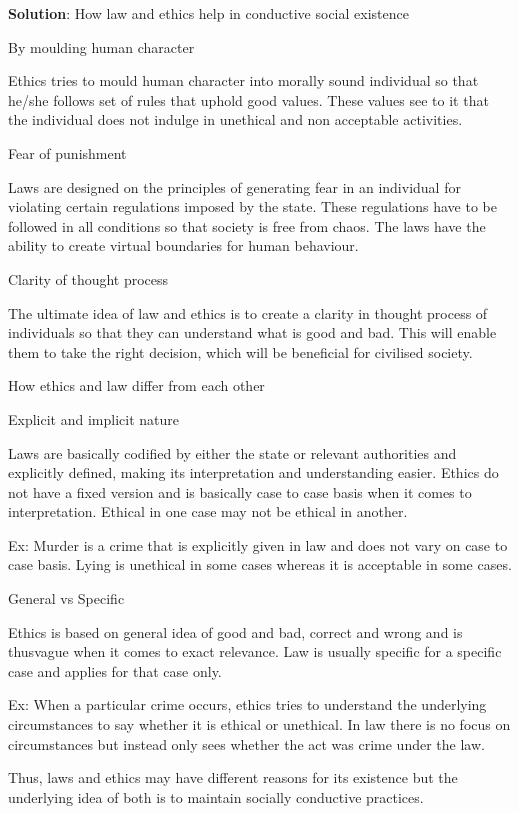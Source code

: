 \documentclass[
  openany]{book}
\newenvironment{solution}{ {\bfseries Solution}:}{}
\begin{document}
\begin{questions}
\begin{solution}
How law and ethics help in conductive social existence

By moulding human character

Ethics tries to mould human character into morally sound individual so that he/she follows set of rules that uphold good values. These values see to it that the individual does not indulge in unethical and non acceptable activities.

Fear of punishment

Laws are designed on the principles of generating fear in an individual for violating certain regulations imposed by the state. These regulations have to be followed in all conditions so that society is free from chaos. The laws have the ability to create virtual boundaries for human behaviour.

Clarity of thought process

The ultimate idea of law and ethics is to create a clarity in thought process of individuals so that they can understand what is good and bad. This will enable them to take the right decision, which will be beneficial for civilised society.

How ethics and law differ from each other

Explicit and implicit nature

Laws are basically codified by either the state or relevant authorities and explicitly defined, making its interpretation and understanding easier. Ethics do not have a fixed version and is basically case to case basis when it comes to interpretation. Ethical in one case may not be ethical in another.

Ex: Murder is a crime that is explicitly given in law and does not vary on case to case basis.
    Lying is unethical in some cases whereas it is acceptable in some cases.
    
General vs Specific

Ethics is based on general idea of good and bad, correct and wrong and is thusvague when it comes to exact relevance. Law is usually specific for a specific case and applies for that case only.

Ex: When a particular crime occurs, ethics tries to understand the underlying circumstances to say whether it is ethical or unethical. In law there is no focus on circumstances but instead only sees whether the act was crime under the law.

Thus, laws and ethics may have different reasons for its existence but the underlying idea of both is to maintain socially conductive practices.


\end{solution}
\end{questions}
\end{document}
